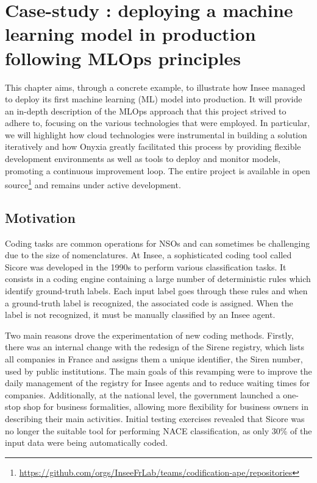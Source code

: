 \section{Case-study : deploying a machine learning model in production following MLOps principles}
\label{sec:mlops}

This chapter aims, through a concrete example, to illustrate how Insee managed to deploy its first machine learning (ML) model into production. It will provide an in-depth description of the MLOps approach that this project strived to adhere to, focusing on the various technologies that were employed. In particular, we will highlight how cloud technologies were instrumental in building a solution iteratively and how Onyxia greatly facilitated this process by providing flexible development environments as well as tools to deploy and monitor models, promoting a continuous improvement loop. The entire project is available in open source\footnote{\url{https://github.com/orgs/InseeFrLab/teams/codification-ape/repositories}} and remains under active development.

\subsection{Motivation}

Coding tasks are common operations for NSOs and can sometimes be challenging due to the size of nomenclatures. At Insee, a sophisticated coding tool called Sicore was developed in the 1990s to perform various classification tasks. It consists in a coding engine containing a large number of deterministic rules which identify ground-truth labels. Each input label goes through these rules and when a ground-truth label is recognized, the associated code is assigned. When the label is not recognized, it must be manually classified by an Insee agent. 

Two main reasons drove the experimentation of new coding methods. Firstly, there was an internal change with the redesign of the Sirene registry, which lists all companies in France and assigns them a unique identifier, the Siren number, used by public institutions. The main goals of this revamping were to improve the daily management of the registry for Insee agents and to reduce waiting times for companies. Additionally, at the national level, the government launched a one-stop shop for business formalities, allowing more flexibility for business owners in describing their main activities. Initial testing exercises revealed that Sicore was no longer the suitable tool for performing NACE classification, as only 30\% of the input data were being automatically coded.

